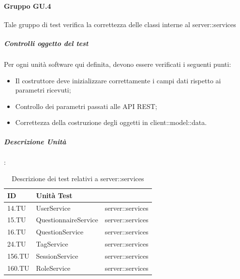 \documentclass[12pt,a4paper]{article}
\begin{document}
\paragraph{Gruppo GU.4}
Tale gruppo di test verifica la correttezza delle classi interne al  server::services
\subparagraph{Controlli oggetto del test}
Per ogni unità software qui definita, devono essere verificati i seguenti punti:
\begin{itemize}
	\item Il costruttore deve inizializzare correttamente i campi dati rispetto ai parametri ricevuti;
	\item Controllo dei parametri passati alle API REST;
	\item Correttezza della costruzione degli oggetti in client::model::data.
\end{itemize}
\subparagraph{Descrizione Unità}:
\begin{table}[H]
	\begin{center}
		\begin{tabular}{p{} p{} p{}}
			\toprule
			\textbf{ID}   & \textbf{Unità Test}	& \textbf{\mgls{package}} \\ \midrule
			\midrule
			14.TU & UserService & server::services\\ \midrule
			15.TU & QuestionnaireService & server::services\\ \midrule
			16.TU & QuestionService & server::services\\ \midrule
			24.TU & TagService & server::services\\ \midrule
			156.TU & SessionService & server::services\\ \midrule
			160.TU & RoleService & server::services\\ \midrule			
			\bottomrule
		\end{tabular}
	\end{center}
	\caption{Descrizione dei test relativi a server::services}
\end{table}
\end{document}

